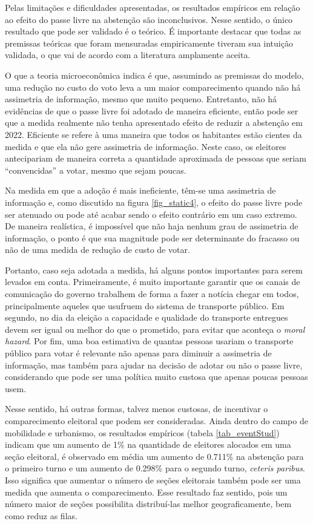 Pelas limitações e dificuldades apresentadas, os resultados empíricos em relação ao efeito do passe livre na abstenção são inconclusivos. Nesse sentido, o único resultado que pode ser validado é o teórico. É importante destacar que todas as premissas teóricas que foram mensuradas empiricamente tiveram sua intuição validada, o que vai de acordo com a literatura amplamente aceita. 

O que a teoria microeconômica indica é que, assumindo as premissas do modelo, uma redução no custo do voto leva a um maior comparecimento quando não há assimetria de informação, mesmo que muito pequeno. Entretanto, não há evidências de que o passe livre foi adotado de maneira eficiente, então pode ser que a medida realmente não tenha apresentado efeito de reduzir a abstenção em 2022. Eficiente se refere à uma maneira que todos os habitantes estão cientes da medida e que ela não gere assimetria de informação. Neste caso, os eleitores antecipariam de maneira correta a quantidade aproximada de pessoas que seriam ``convencidas'' a votar, mesmo que sejam poucas.

Na medida em que a adoção é mais ineficiente, têm-se uma assimetria de informação e, como discutido na figura \ref{fig_static4}, o efeito do passe livre pode ser atenuado ou pode até acabar sendo o efeito contrário em um caso extremo. De maneira realística, é impossível que não haja nenhum grau de assimetria de informação, o ponto é que sua magnitude pode ser determinante do fracasso ou não de uma medida de redução de custo de votar.

Portanto, caso seja adotada a medida, há alguns pontos importantes para serem levados em conta. Primeiramente, é muito importante garantir que os canais de comunicação do governo trabalhem de forma a fazer a notícia chegar em todos, principalmente aqueles que usufruem do sistema de transporte público. Em segundo, no dia da eleição a capacidade e qualidade do transporte entregues devem ser igual ou melhor do que o prometido, para evitar que aconteça o \textit{moral hazard}. Por fim, uma boa estimativa de quantas pessoas usariam o transporte público para votar é relevante não apenas para diminuir a assimetria de informação, mas também para ajudar na decisão de adotar ou não o passe livre, considerando que pode ser uma política muito custosa que apenas poucas pessoas usem.

Nesse sentido, há outras formas, talvez menos custosas, de incentivar o comparecimento eleitoral que podem ser consideradas. Ainda dentro do campo de mobilidade e urbanismo, os resultados empíricos (tabela \ref{tab_eventStud}) indicam que um aumento de 1\% na quantidade de eleitores alocados em uma seção eleitoral, é observado em média um aumento de 0.711\% na abstenção para o primeiro turno e um aumento de 0.298\% para o segundo turno, \textit{ceteris paribus}. Isso significa que aumentar o número de seções eleitorais também pode ser uma medida que aumenta o comparecimento. Esse resultado faz sentido, pois um número maior de seções possibilita distribuí-las melhor geograficamente, bem como reduz as filas.

